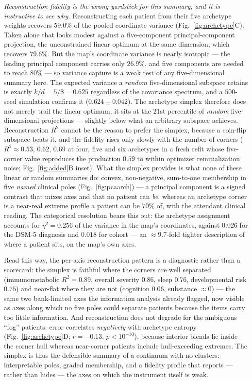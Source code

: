 \emph{Reconstruction fidelity is the wrong yardstick for this summary, and it is
instructive to see why.} Reconstructing each patient from their five archetype
weights recovers $59.0\%$ of the pooled coordinate variance
(Fig.~\ref{fig:archetype}C). Taken alone that looks modest against a five-component
principal-component projection, the unconstrained linear optimum at the same
dimension, which recovers $79.6\%$. But the map's coordinate variance is nearly
isotropic --- the leading principal component carries only $26.9\%$, and five
components are needed to reach $80\%$ --- so variance capture is a weak test of any
five-dimensional summary here. The expected variance a \emph{random} five-dimensional
subspace retains is exactly $k/d=5/8=0.625$ regardless of the covariance spectrum,
and a $500$-seed simulation confirms it ($0.624\pm0.042$). The archetype simplex
therefore does not merely trail the linear optimum; it sits at the $21$st percentile
of \emph{random} five-dimensional projections --- slightly below what an arbitrary
subspace achieves. Reconstruction $R^2$ cannot be the reason to prefer the simplex,
because a coin-flip subspace beats it, and the fidelity rises only slowly with the
number of corners ($R^2\approx0.53$, $0.62$, $0.69$ at four, five and six archetypes
in a fresh refit whose five-corner value reproduces the production $0.59$ to within
optimizer reinitialization noise; Fig.~\ref{fig:added}B inset). What the simplex provides is what none of these linear
or random summaries do: convex, non-negative, sum-to-one membership in five
\emph{named} clinical poles (Fig.~\ref{fig:pcaarch}) --- a principal component is a
signed contrast that mixes axes and that no patient can \emph{be}, whereas an
archetype corner is a near-real extreme profile a patient can be $70\%$ of, with the
attendant clinical reading. The categorical resolution bears this out: the archetype
assignment accounts for $\eta^2=0.256$ of the variance in the map's coordinates,
against $0.026$ for the DSM-5 diagnosis and $0.018$ for cohort --- an
$\approx\!9.7$-fold tighter description of where a patient sits, on the map's own
axes.

Read this way, the per-axis reconstruction pattern is a diagnostic rather than a
scorecard: the simplex is faithful where the corners are well separated
(immunometabolic $R^2=0.89$, overall severity $0.86$, sleep $0.76$, developmental
risk $0.75$) and near-flat where they are not (cognition $0.06$, substance
$\approx0$) --- the same two bank-limited axes the information analysis already
flagged, now visible as axes along which no five poles could separate patients
because the items carry too little information. And reconstruction does not degrade
for the ambiguous ``fog'' patients: error correlates \emph{negatively} with
archetype entropy (Fig.~\ref{fig:archetype}D; $r=-0.13$, $p<10^{-30}$), because
interior blends lie inside the corner hull whereas near-corner patients include
hull-exceeding extremes. The simplex is thus the defensible summary of a continuum
with no clusters: interpretable poles, graded membership, and a fidelity profile
that reports --- rather than hides --- the axes on which the instrument itself is
weak.

